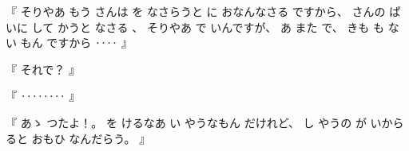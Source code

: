
%
『
そりやあ
もう
さんは
を
なさらうと
に
おなんなさる
ですから、
%
さんの
ぱいに
して
かうと
なさる
、
%
%
そりやあ
で
いんですが、
%
あ
また
で、
%
きも
も
ない
もん
ですから
‥‥
』

%
『
それで？
』

%
『
‥‥‥‥
』

%
『
あゝ
つたよ！。
%
を
けるなあ
い
やうなもん
だけれど、
%
し
やうの
が
いから
ると
おもひ
なんだらう。
』

